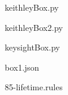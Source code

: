 \documentclass[../thesis.tex]{subfiles}
\begin{document}
keithleyBox.py
%

keithleyBox2.py
%

keysightBox.py
%

box1.json
%

85-lifetime.rules
%



\end{document}
